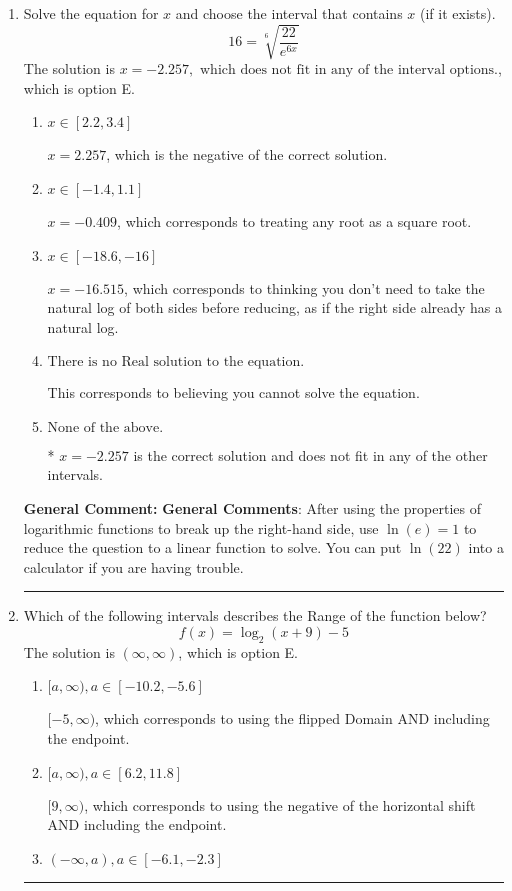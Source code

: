 \documentclass{extbook}[14pt]
\newcommand{\litem}[1]{\item #1

\rule{\textwidth}{0.4pt}}
\begin{document}
\begin{enumerate}\litem{
 Solve the equation for $x$ and choose the interval that contains $x$ (if it exists).
\[  16 = \sqrt[6]{\frac{22}{e^{6x}}} \]The solution is \( x = -2.257, \text{ which does not fit in any of the interval options.} \), which is option E.\begin{enumerate}[label=\Alph*.]
\item \( x \in [2.2, 3.4] \)

$x = 2.257$, which is the negative of the correct solution.
\item \( x \in [-1.4, 1.1] \)

$x = -0.409$, which corresponds to treating any root as a square root.
\item \( x \in [-18.6, -16] \)

$x = -16.515$, which corresponds to thinking you don't need to take the natural log of both sides before reducing, as if the right side already has a natural log.
\item \( \text{There is no Real solution to the equation.} \)

This corresponds to believing you cannot solve the equation.
\item \( \text{None of the above.} \)

* $x = -2.257$ is the correct solution and does not fit in any of the other intervals.
\end{enumerate}

\textbf{General Comment:} \textbf{General Comments}: After using the properties of logarithmic functions to break up the right-hand side, use $\ln(e) = 1$ to reduce the question to a linear function to solve. You can put $\ln(22)$ into a calculator if you are having trouble.
}
\litem{
Which of the following intervals describes the Range of the function below?
\[ f(x) = \log_2{(x+9)}-5 \]The solution is \( (\infty, \infty) \), which is option E.\begin{enumerate}[label=\Alph*.]
\item \( [a, \infty), a \in [-10.2, -5.6] \)

$[-5, \infty)$, which corresponds to using the flipped Domain AND including the endpoint.
\item \( [a, \infty), a \in [6.2, 11.8] \)

$[9, \infty)$, which corresponds to using the negative of the horizontal shift AND including the endpoint.
\item \( (-\infty, a), a \in [-6.1, -2.3] \)


\end{enumerate}}
\end{enumerate}
\end{document}
